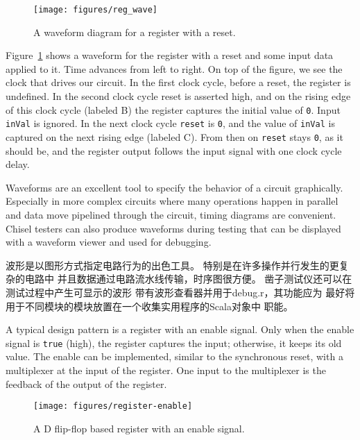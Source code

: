 \documentclass[%
    10pt,
    headinclude, footexclude,
    openright, %
    notitlepage,
    cleardoubleempty,
    headsepline,
    pointlessnumbers,
    bibtotoc, idxtotoc,
    ]{scrbook}
\newcommand{\code}[1]{{\small{\texttt{#1}}}}
\newcommand{\scale}{0.7}
\newcommand{\todo}[1]{{\emph{TODO: #1}}}
\renewcommand{\todo}[1]{}
\begin{document}
\todo{from Luca: Do readers know about timing diagrams?}

\begin{figure}
  \centering
  \texttt{[image: figures/reg\_wave]}
  \caption{A waveform diagram for a register with a reset.}
  \label{fig:register-wave}
\end{figure}

Figure~\ref{fig:register-wave} shows a waveform for the register with a reset
and some input data applied to it.
Time advances from left to right. On top of the figure, we see the clock that drives our circuit.
In the first clock cycle, before a reset, the register is undefined. In the second clock cycle reset
is asserted high, and on the rising edge of this clock cycle (labeled B) the register
captures the initial value of \code{0}. Input \code{inVal} is ignored. In the next clock cycle
\code{reset} is \code{0}, and the value of \code{inVal} is captured on the next rising
edge (labeled C). From then on \code{reset} stays \code{0}, as it should be, and the
register output follows the input signal with one clock cycle delay.

Waveforms are an excellent tool to specify the behavior of a circuit graphically.
Especially in more complex circuits where many operations happen in parallel
and data move pipelined through the circuit, timing diagrams are convenient.
Chisel testers can also produce waveforms during testing that can be displayed
with a waveform viewer and used for debugging.


波形是以图形方式指定电路行为的出色工具。
特别是在许多操作并行发生的更复杂的电路中
并且数据通过电路流水线传输，时序图很方便。
凿子测试仪还可以在测试过程中产生可显示的波形
带有波形查看器并用于debug.r，其功能应为
最好将用于不同模块的模块放置在一个收集实用程序的Scala对象中
职能。

A typical design pattern is a register with an enable signal. Only when the enable signal
is \code{true} (high), the register captures the input; otherwise, it keeps its old value.
The enable can be implemented, similar to the synchronous reset, with
a multiplexer at the input of the register. One input to the multiplexer is the feedback of the
output of the register.

\begin{figure}
  \centering
  \texttt{[image: figures/register-enable]}
  \caption{A D flip-flop based register with an enable signal.}
  \label{fig:register-enable}
\end{figure}
\end{document}
